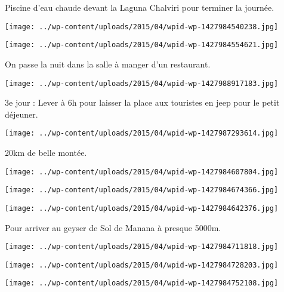  \newline
 Piscine d'eau chaude devant la Laguna Chalviri pour terminer la journée. \newline
 \newline
\centerline{\texttt{[image: ../wp-content/uploads/2015/04/wpid-wp-1427984540238.jpg]} } 
 \newline
 \newline
\centerline{\texttt{[image: ../wp-content/uploads/2015/04/wpid-wp-1427984554621.jpg]} } 
 \newline
 On passe la nuit dans la salle à manger d'un restaurant. \newline
 \newline
\centerline{\texttt{[image: ../wp-content/uploads/2015/04/wpid-wp-1427988917183.jpg]} } 
 \newline
 3e jour : \newline
 Lever à 6h pour laisser la place aux touristes en jeep pour le petit déjeuner. \newline
 \newline
\centerline{\texttt{[image: ../wp-content/uploads/2015/04/wpid-wp-1427987293614.jpg]} } 
 \newline
 20km de belle montée. \newline
 \newline
\centerline{\texttt{[image: ../wp-content/uploads/2015/04/wpid-wp-1427984607804.jpg]} } 
 \newline
 \newline
\centerline{\texttt{[image: ../wp-content/uploads/2015/04/wpid-wp-1427984674366.jpg]} } 
 \newline
 \newline
\centerline{\texttt{[image: ../wp-content/uploads/2015/04/wpid-wp-1427984642376.jpg]} } 
 \newline
 Pour arriver au geyser de Sol de Manana à presque 5000m. \newline
 \newline
\centerline{\texttt{[image: ../wp-content/uploads/2015/04/wpid-wp-1427984711818.jpg]} } 
 \newline
 \newline
\centerline{\texttt{[image: ../wp-content/uploads/2015/04/wpid-wp-1427984728203.jpg]} } 
 \newline
 \newline
\centerline{\texttt{[image: ../wp-content/uploads/2015/04/wpid-wp-1427984752108.jpg]} } 

